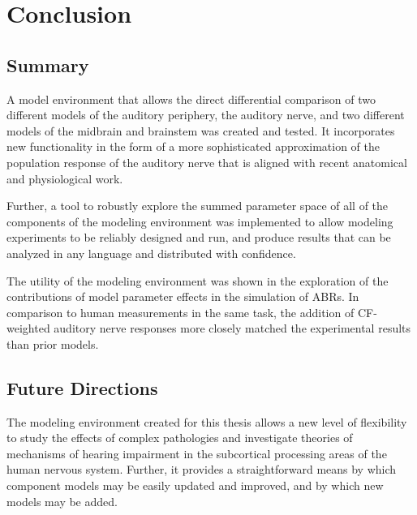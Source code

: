 \chapter{Conclusion}
\label{chapter:Conclusion}
\thispagestyle{myheadings}

\graphicspath{{7_Conclusion/Figures/}}

\section{Summary} %
\label{sec:conclusion}
A model environment that allows the direct differential comparison of two different models of the auditory periphery, the auditory nerve, and two different models of the midbrain and brainstem was created and tested.  It incorporates new functionality in the form of a more sophisticated approximation of the population response of the auditory nerve that is aligned with recent anatomical and physiological work.  

Further, a tool to robustly explore the summed parameter space of all of the components of the modeling environment was implemented to allow modeling experiments to be reliably designed and run, and produce results that can be analyzed in any language and distributed with confidence. 

The utility of the modeling environment was shown in the exploration of the contributions of model parameter effects in the simulation of ABRs.  In comparison to human measurements in the same task, the addition of CF-weighted auditory nerve responses more closely matched the experimental results than prior models.

\section{Future Directions} %
The modeling environment created for this thesis allows a new level of flexibility to study the effects of complex pathologies and investigate theories of mechanisms of hearing impairment in the subcortical processing areas of the human nervous system.   Further, it provides a straightforward means by which component models may be easily updated and improved, and by which new models may be added.   

